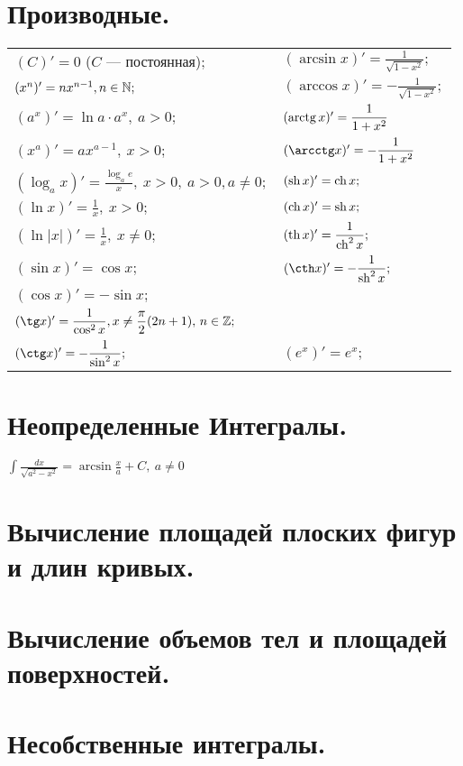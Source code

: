 \section{Производные.}
\renewcommand*{\arraystretch}{2}
\noindent\begin{tabular}{ l l }
$(C)'=0$ ($C$ --- постоянная); 
&
$(\arcsin x)' = \displaystyle\frac{1}{\sqrt{1-x^2}};$
\\
$(x^n)' = nx^{n-1}, n\in \mathbb{N};$
&
$(\arccos x)' = -\displaystyle\frac{1}{\sqrt{1-x^2}};$
\\
$(a^x)'=\ln a\cdot a^x,\ a>0;$
&
$(\mathop{\rm arctg}\nolimits x)' = \displaystyle\frac{1}{1+x^2}$
\\
$(x^a)'=ax^{a-1},\ x>0;$
&
$(\arcctg x)' = -\displaystyle\frac{1}{1+x^2}$
\\
$(\log_a x)'=\displaystyle\frac{\log_a e}{x},\ x>0,\ a>0, a\ne 0;$
&
$(\mathop{\rm sh}\nolimits x)'= \mathop{\rm ch}\nolimits x;$
\\
$(\ln x)' = \displaystyle\frac{1}{x},\ x>0;$
&
$(\mathop{\rm ch}\nolimits x)'= \mathop{\rm sh}\nolimits x;$
\\
$(\ln |x|)' = \displaystyle\frac{1}{x},\ x\ne 0;$
&
$(\mathop{\rm th}\nolimits x)'= \displaystyle\frac{1}{\mathop{\rm ch}\nolimits^2 x};$
\\
$(\sin x)'=\cos x;$
&
$(\cth x)'= -\displaystyle\frac{1}{\sh^2 x};$
\\
$(\cos x)'=-\sin x;$
&
\\
$(\tg x)'= \displaystyle\frac{1}{\cos^2 x}, x \ne \frac{\pi}{2}(2n+1),\, n\in \bbZ;$
&
\\
$(\ctg x)'= -\displaystyle\frac{1}{\sin^2 x};$
&
$(e^x)'=e^x;$
\\
\end{tabular}

\section{Неопределенные Интегралы.}
$\int \frac{dx}{\sqrt{a^2-x^2}}=\arcsin\frac{x}{a}+C,\ a\ne 0$

\section{Вычисление площадей плоских фигур и длин кривых.}

\section{Вычисление объемов тел и площадей поверхностей.}

\section{Несобственные интегралы.}

